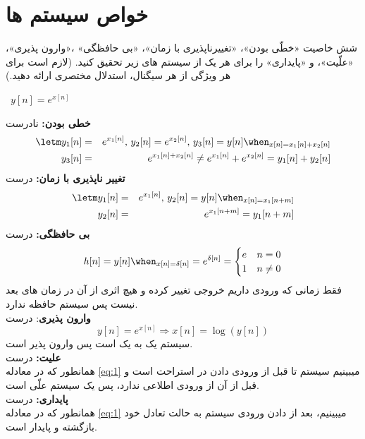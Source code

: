 \section{خواص سیستم ها}
شش خاصیت «خطّی بودن»، «تغییرناپذیری با زمان»، «بی حافظگی» ،«وارون پذیری»، «علّیت»، و «پایداری» را برای
هر یک از سیستم های زیر تحقیق کنید. (لازم است برای هر ویژگی از هر سیگنال، استدلال مختصری ارائه دهید.)

\begin{qsolve}
	\textbullet\ $y[n]=e^{x[n]}$
	\begin{qsolve}[]
		\textbf{خطی بودن:} نادرست
		\begin{eqnarray*}
			\letm y_1[n]&=&e^{x_1[n]},\, y_2[n]=e^{x_2[n]},\,
			y_3[n]=y[n]\when_{x[n]=x_1[n]+x_2[n]}\\
			y_3[n]&=&e^{x_1[n]+x_2[n]} \neq e^{x_1[n]} + e^{x_2[n]} = y_1[n]+y_2[n]
		\end{eqnarray*}
		\textbf{تغییر ناپذیری با زمان:} درست
		\begin{eqnarray*}
			\letm y_1[n]&=&e^{x_1[n]},\, y_2[n]=y[n]\when_{x[n]=x_1[n+m]}\\
			y_2[n]&=&e^{x_1[n+m]} = y_1[n+m]
		\end{eqnarray*}
		\textbf{بی حافظگی:} درست
		\begin{eqnarray}\label{eq:1}
			h[n]=y[n]\when_{x[n]=\delta[n]}=e^{\delta[n]}=
			\begin{cases}
				e & n = 0    \\
				1 & n \neq 0
			\end{cases}
		\end{eqnarray}
		فقط زمانی که ورودی داریم خروجی تغییر کرده و هیچ اثری از
		آن در زمان های بعد نیست پس سیستم حافظه ندارد.\\
		\textbf{وارون پذیری}: درست
		$$y[n]=e^{x[n]}\Rightarrow x[n]=\log{(y[n])}$$
		سیستم یک به یک است پس وارون پذیر است.\\
		\textbf{علیت:} درست\\
		همانطور که در معادله \ref*{eq:1} میبینیم سیستم تا
		قبل از ورودی دادن در استراحت است و قبل از آن از ورودی
		اطلاعی ندارد، پس یک سیستم علّی است.\\
		\textbf{پایداری:} درست\\
		همانطور که در معادله \ref*{eq:1} میبینیم، بعد از
		دادن ورودی سیستم به حالت تعادل خود بازگشته و پایدار است.
	\end{qsolve}
\end{qsolve}
